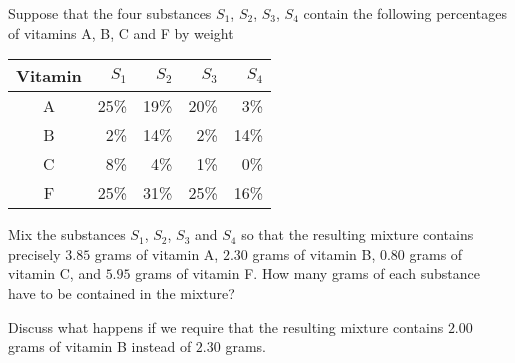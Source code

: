 \documentclass{ximera}
\begin{document}
\begin{exercise} \label{c2.1.7}
Suppose that the four substances $S_1$, $S_2$, $S_3$, $S_4$
contain the following percentages of vitamins A, B, C and F by
weight
\begin{center}
\begin{tabular}{|c||r|r|r|r|}
\hline
Vitamin   & $S_1$ & $S_2$ & $S_3$ & $S_4$\\
\hline
 A & 25\% &    19\% &    20\% &    3\% \\
 B &  2\% &    14\% &     2\% &   14\% \\
 C &  8\% &     4\% &     1\% &     0\% \\
 F & 25\% &    31\% &    25\% &    16\% \\
\hline
\end{tabular}
\end{center}
Mix the substances $S_1$, $S_2$, $S_3$ and $S_4$ so that the
resulting mixture contains precisely $3.85$ grams of vitamin A,
$2.30$ grams of vitamin B, $0.80$ grams of vitamin C, and $5.95$
grams of vitamin F.  How many grams of each substance have to be
contained in the mixture?

Discuss what happens if we require that the resulting mixture contains
$2.00$ grams of vitamin B instead of $2.30$ grams.
\end{exercise}
\end{document}
